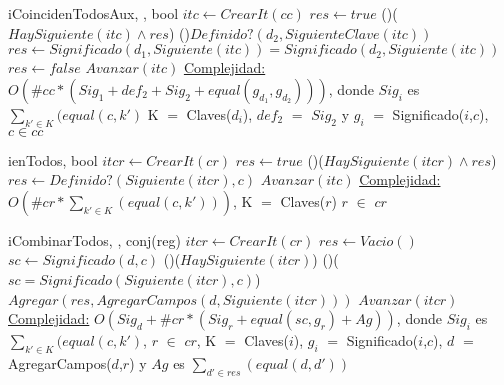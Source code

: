 \begin{Algoritmos}
\begin{algoritmo}{iCoincidenTodosAux}{, , }{bool}
    $itc \gets CrearIt(cc) $ 
    $res \gets true $ 
    \While(){($HaySiguiente(itc) \wedge res$)}{
    	\eIf(){$Definido?(d_2,SiguienteClave(itc))$}{
		$res \gets Significado(d_1,Siguiente(itc)) = Significado(d_2,Siguiente(itc))$ 
		}{
        $res \gets false $ 
        }
    	$Avanzar(itc)$ 
	}
    \medskip
	\underline{Complejidad:} $O(\#cc*(Sig_1 + def_2 + Sig_2 + equal(g_{d_1},g_{d_2})))$, donde $Sig_i$ es $\sum_{k' \in K}(equal(c,k')$ K $=$ Claves($d_i$), $def_2$ $=$ $Sig_2$ y $g_i$ $=$ Significado($i$,$c$), $c \in cc$ 
\end{algoritmo}

\begin{algoritmo}{ienTodos}{, }{bool}
    $itcr \gets CrearIt(cr) $ 
    $res \gets true $ 
    \While(){($HaySiguiente(itcr) \wedge res$)}{
    	$res \gets Definido?(Siguiente(itcr), c)$
		$Avanzar(itc)$ 
	}
    \medskip
	\underline{Complejidad:} $O(\#cr*\sum_{k' \in K}(equal(c,k')))$, K $=$ Claves($r$) $r$ $\in$ $cr$
\end{algoritmo}

\begin{algoritmo}{iCombinarTodos}{, , }{conj(reg)}
    $itcr \gets CrearIt(cr) $ 
    $res \gets Vacio() $ 
    $sc  \gets Significado(d,c)$  
   \While(){($HaySiguiente(itcr)$)}{
    	\If(){($sc = Significado(Siguiente(itcr),c)$)}{
			$Agregar(res, AgregarCampos(d, Siguiente(itcr)))$ 
		}
     	$Avanzar(itcr)$ 	
   }
    \medskip
	\underline{Complejidad:} $O(Sig_d + \#cr*(Sig_r + equal(sc,g_{r}) + Ag))$, donde $Sig_i$ es $\sum_{k' \in K}(equal(c,k')$, $r$ $\in$ $cr$, K $=$ Claves($i$), $g_i$ $=$ Significado($i$,$c$), $d$ $=$ AgregarCampos($d$,$r$) y $Ag$ es $\sum_{d' \in res}(equal(d,d'))$
\end{algoritmo}


\end{Algoritmos}
